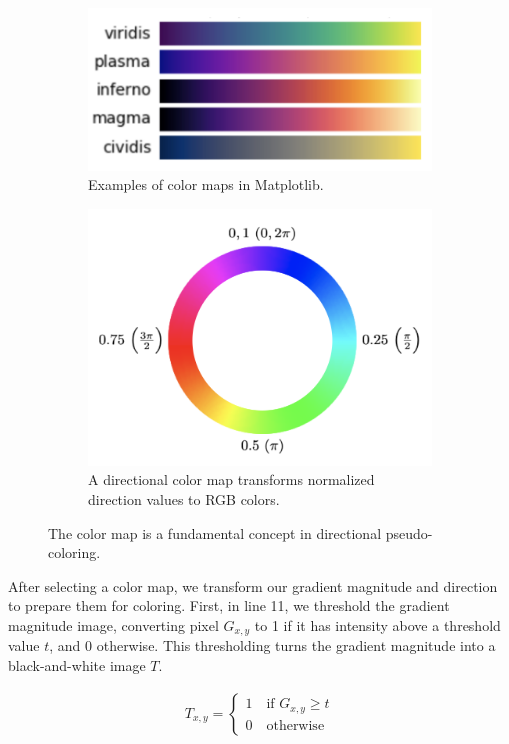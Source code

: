 \documentclass{article}
\begin{document}
\begin{figure}[h]
\centering
\begin{subfigure}{0.4\textwidth}
\centering
\includegraphics[width=0.7\linewidth]{images/matplotlib_colormaps} 
\caption{Examples of color maps in Matplotlib.}
\end{subfigure}
\begin{subfigure}{0.4\textwidth}
\centering
\includegraphics[width=0.7\linewidth]{images/directional_colormap}
\caption{A directional color map transforms normalized direction values to RGB colors.}
\end{subfigure}
\caption{The color map is a fundamental concept in directional pseudo-coloring.}
\end{figure}

After selecting a color map, we transform our gradient magnitude and direction to prepare them for coloring. First, in line 11, we threshold the gradient magnitude image, converting pixel $G_{x,y}$ to 1 if it has intensity above a threshold value $t$, and 0 otherwise. This thresholding turns the gradient magnitude into a black-and-white image $T$.

\begin{align}
T_{x,y} = \left\{
  \begin{array}{lr}
    1 \quad \text{if  } G_{x,y} \geq t \\
    0 \quad \text{otherwise}
  \end{array}
\right.
\end{align}
\end{document}
